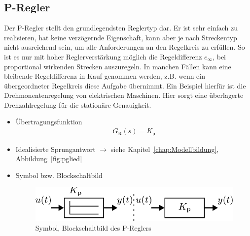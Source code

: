 \subsection{P-Regler}
%
Der P-Regler stellt den grundlegendsten Reglertyp dar. Er ist sehr einfach zu realisieren, hat keine verzögernde Eigenschaft, kann aber je nach Streckentyp nicht ausreichend sein, um alle Anforderungen an den Regelkreis zu erfüllen. So ist es nur mit hoher Reglerverstärkung möglich die Regeldifferenz $e_{\infty}$, bei proportional wirkenden Strecken auszuregeln.  In manchen Fällen kann eine bleibende Regeldifferenz in Kauf genommen werden, z.B. wenn ein übergeordneter Regelkreis diese Aufgabe übernimmt. Ein Beispiel hierfür ist die Drehmonentenregelung von elektrischen Maschinen. Hier sorgt eine überlagerte Drehzahlregelung für die stationäre Genauigkeit.
%
\begin{itemize}
%
\item Übertragungsfunktion
%
\begin{equation*}
\begin{aligned}
%
G_{\text{R}}(s)=K_{\text{p}}
%
\end{aligned}
\end{equation*}
%
\item Idealisierte Sprungantwort $\rightarrow$ siehe Kapitel~\ref{chap:Modellbildung}, Abbildung~\ref{fig:pglied}
%
\item Symbol bzw. Blockschaltbild
%
\begin{figure}[h]
	\centering
	\includegraphics[width=0.65\linewidth]{Abbildungen/Modellbildung/PDF/PgliedBlock.pdf}
	\caption{Symbol, Blockschaltbild des P-Reglers}
\end{figure}
%
\end{itemize}
%
